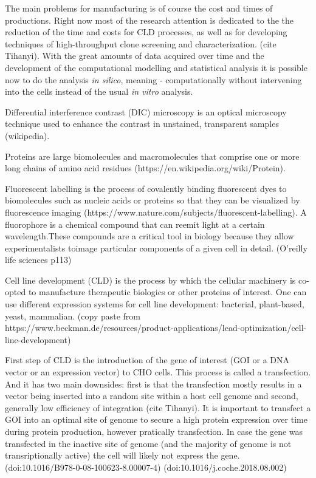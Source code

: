 The main problems for manufacturing is of course the cost and times of productions. Right now most of the research attention is dedicated to the the reduction of the time and costs for CLD processes, as well as for developing techniques of high-throughput clone screening and characterization. (cite Tihanyi). With the great amounts of data acquired over time and the development of the computational modelling and statistical analysis it is possible now to do the analysis \textit{in silico}, meaning - computationally without intervening into the cells instead of the usual \textit{in vitro} analysis.

Differential interference contrast (DIC) microscopy is an optical microscopy technique used to enhance the contrast in unstained, transparent samples (wikipedia).

Proteins are large biomolecules and macromolecules that comprise one or more long chains of amino acid residues (https://en.wikipedia.org/wiki/Protein).

Fluorescent labelling is the process of covalently binding fluorescent dyes to biomolecules such as nucleic acids or proteins so that they can be visualized by fluorescence imaging (https://www.nature.com/subjects/fluorescent-labelling). A fluorophore is a chemical compound that can reemit light at a certain wavelength.These compounds are a critical tool in biology because they allow experimentalists toimage particular components of a given cell in detail. (O'reilly life sciences p113)

Cell line development (CLD) is the process by which the cellular machinery is co-opted to manufacture therapeutic biologics or other proteins of interest. One can use different expression systems for cell line development: bacterial, plant-based, yeast, mammalian. (copy paste from https://www.beckman.de/resources/product-applications/lead-optimization/cell-line-development)


First step of CLD is the
introduction of the gene of interest (GOI or a DNA vector or an expression vector) to CHO cells. This process is called a transfection. And it has two main downsides: first is that the transfection mostly results in a vector being inserted into a random site within a host cell genome and second, generally low efficiency of integration (cite Tihanyi). It is important to transfect a GOI into an optimal site of genome to secure a high protein expression over time during protein production, however pratically transfection. In case the gene was transfected in the inactive site of genome (and the majority of genome is not transriptionally active) the cell will likely not express the gene. (doi:10.1016/B978-0-08-100623-8.00007-4) (doi:10.1016/j.coche.2018.08.002)

